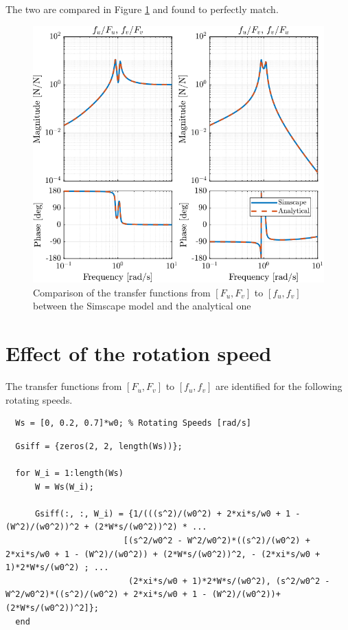 \documentclass[a4paper, 10pt, DIV=12, parskip=full]{scrreprt}
\begin{document}
The two are compared in Figure \ref{fig:plant_iff_comp_simscape_analytical} and found to perfectly match.
\begin{figure}[htbp]
\centering
\includegraphics[scale=1]{figs/plant_iff_comp_simscape_analytical.png}
\caption{\label{fig:plant_iff_comp_simscape_analytical}Comparison of the transfer functions from \([F_u, F_v]\) to \([f_u, f_v]\) between the Simscape model and the analytical one}
\end{figure}

\section{Effect of the rotation speed}
\label{sec:org17fee48}
The transfer functions from \([F_u, F_v]\) to \([f_u, f_v]\) are identified for the following rotating speeds.
\begin{verbatim}
  Ws = [0, 0.2, 0.7]*w0; % Rotating Speeds [rad/s]
\end{verbatim}

\begin{verbatim}
  Gsiff = {zeros(2, 2, length(Ws))};

  for W_i = 1:length(Ws)
      W = Ws(W_i);

      Gsiff(:, :, W_i) = {1/(((s^2)/(w0^2) + 2*xi*s/w0 + 1 - (W^2)/(w0^2))^2 + (2*W*s/(w0^2))^2) * ...
                        [(s^2/w0^2 - W^2/w0^2)*((s^2)/(w0^2) + 2*xi*s/w0 + 1 - (W^2)/(w0^2)) + (2*W*s/(w0^2))^2, - (2*xi*s/w0 + 1)*2*W*s/(w0^2) ; ...
                         (2*xi*s/w0 + 1)*2*W*s/(w0^2), (s^2/w0^2 - W^2/w0^2)*((s^2)/(w0^2) + 2*xi*s/w0 + 1 - (W^2)/(w0^2))+ (2*W*s/(w0^2))^2]};
  end
\end{verbatim}
\end{document}
